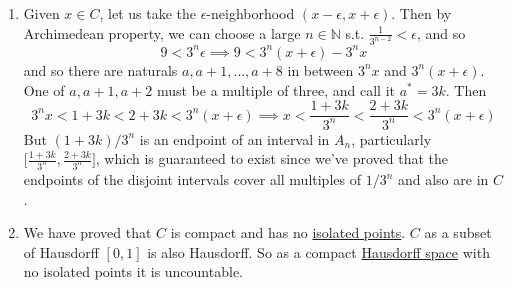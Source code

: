 \begin{solution}
\begin{enumerate}
      \item Given $x \in C$, let us take the $\epsilon$-neighborhood $(x - \epsilon, x + \epsilon)$. Then by Archimedean property, we can choose a large $n \in \mathbb{N}$ s.t. $\frac{1}{3^{n-2}} < \epsilon$, and so 
      \begin{equation}
        9 < 3^{n} \epsilon \implies 9 < 3^n (x + \epsilon) - 3^n x
      \end{equation}
      and so there are naturals $a, a+1, \ldots, a+8$ in between $3^n x$ and $3^n (x + \epsilon)$. One of $a, a+1, a+2$ must be a multiple of three, and call it $a^\ast = 3k$. Then 
      \begin{equation}
        3^n x < 1 + 3k < 2 + 3k < 3^n (x + \epsilon) \implies x < \frac{1 + 3k}{3^n} < \frac{2 + 3k}{3^n} < 3^n (x + \epsilon)
      \end{equation}
      But $(1 + 3k)/3^n$ is an endpoint of an interval in $A_n$, particularly $\big[\frac{1+3k}{3^n}, \frac{2 + 3k}{3^n} \big]$, which is guaranteed to exist since we've proved that the endpoints of the disjoint intervals cover all multiples of $1/3^n$ and also are in $C$.  

      \item We have proved that $C$ is compact and has no \hyperref[def:isolated-point]{isolated points}. $C$ as a subset of Hausdorff $[0, 1]$ is also Hausdorff. So as a compact \hyperref[def:hausdorff-space]{Hausdorff space} with no isolated points it is uncountable. 
    \end{enumerate}
  \end{solution}

